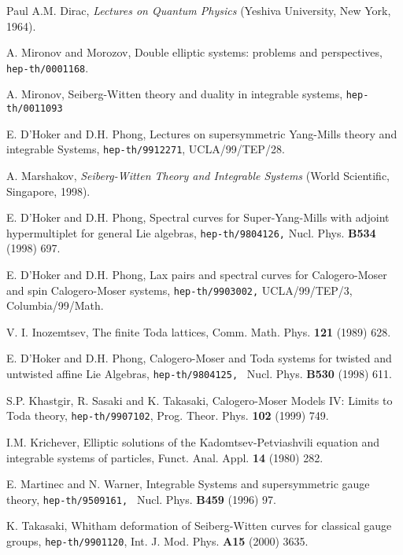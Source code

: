 \documentclass[a4paper,12pt]{article}
\begin{document}
\begin{thebibliography}{99}
	 Paul A.M. Dirac, \textit{Lectures on Quantum Physics}
(Yeshiva University, New York, 1964).

  A. Mironov and Morozov, Double elliptic systems: problems and
perspectives, \texttt{hep-th/0001168}.

 A. Mironov, Seiberg-Witten theory and duality in integrable
systems, \texttt{hep-th/0011093}

  E. D'Hoker and D.H. Phong, Lectures on supersymmetric
Yang-Mills theory and integrable Systems,
\texttt{hep-th/9912271}, UCLA/99/TEP/28.

  A. Marshakov, \textit{Seiberg-Witten Theory and
Integrable Systems} (World Scientific, Singapore, 1998).

  E. D'Hoker and D.H. Phong, Spectral curves for
Super-Yang-Mills with adjoint hypermultiplet for general Lie
algebras,
\texttt{hep-th/9804126,} Nucl. Phys. \textbf{B534} (1998) 697.

  E. D'Hoker and D.H. Phong, Lax pairs and spectral curves for
Calogero-Moser and spin Calogero-Moser systems,
\texttt{hep-th/9903002,} UCLA/99/TEP/3, Columbia/99/Math.

	V. I. Inozemtsev, The finite Toda lattices, Comm. Math.
Phys. \textbf{121} (1989) 628.

  E. D'Hoker and D.H. Phong, Calogero-Moser and Toda systems
for twisted and untwisted affine Lie Algebras,
\texttt{hep-th/9804125, } Nucl. Phys. \textbf{B530 }(1998)
611.

  S.P. Khastgir, R. Sasaki and K. Takasaki, Calogero-Moser
Models IV: Limits to Toda theory, \texttt{hep-th/9907102},
Prog. Theor. Phys. \textbf{102} (1999) 749.

  I.M. Krichever, Elliptic solutions of
the Kadomtsev-Petviashvili equation and integrable systems
of particles, Funct. Anal. Appl. \textbf{14} (1980) 282.

  E. Martinec and N. Warner,
Integrable Systems and supersymmetric gauge theory,
\texttt{hep-th/9509161, } Nucl. Phys. \textbf{B459} (1996)
97.

	K. Takasaki, Whitham deformation of Seiberg-Witten curves
for classical gauge groups, \texttt{hep-th/9901120}, Int. J. Mod. Phys.
\textbf{A15} (2000) 3635.

\end{thebibliography}
\end{document}
